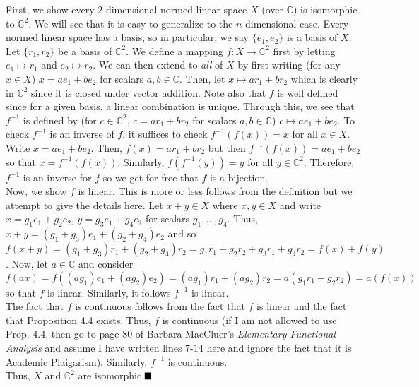 \documentclass{article}
\begin{document}
    First, we show every 2-dimensional normed linear space $X$ (over $\mathbb{C}$) is isomorphic to $\mathbb{C}^2$. 
    We will see that it is easy to generalize to the $n$-dimensional case.
    Every normed linear space has a basis, so in particular, we say $\{e_1,e_2\}$ is a basis of $X$. Let $\{r_1,r_2\}$ be a basis of $\mathbb{C}^2$.
    We define a mapping $f:X\to\mathbb{C}^2$ first by letting $e_1\mapsto r_1$ and $e_2\mapsto r_2$. We can then extend to \textit{all} of $X$ by first writing
    (for any $x\in X$) $x = ae_1 + be_2$ for scalars $a,b\in\mathbb{C}$. Then, let $x\mapsto ar_1 + br_2$ which is clearly in $\mathbb{C}^2$ since it is closed under
    vector addition. Note also that $f$ is well defined since for a given basis, a linear combination is unique.
    Through this, we see that $f^{-1}$ is defined by (for $c\in\mathbb{C}^2$, $c = ar_1+br_2$ for scalars $a,b\in\mathbb{C}$)
    $c\mapsto ae_1 + be_2$. To check $f^{-1}$ is an inverse of $f$, it suffices to check $f^{-1}(f(x)) = x$ for all $x\in X$. Write $x = ae_1 + be_2$. Then,
    $f(x) = ar_1 + br_2$ but then $f^{-1}(f(x)) = ae_1 + be_2$ so that $x = f^{-1}(f(x))$. Similarly, $f(f^{-1}(y)) = y$ for all $y\in\mathbb{C}^2$.
    Therefore, $f^{-1}$ is an inverse for $f$ so we get for free that $f$ is a bijection.\\

    Now, we show $f$ is linear. This is more or less follows from the definition but we attempt to give the details here. Let $x+y\in X$ where
    $x,y\in X$ and write $x = g_1e_1 + g_2e_2$, $y = g_3e_1 + g_4e_2$ for scalars $g_1,\hdots,g_4$. Thus,
    $x+y = (g_1+g_3)e_1 + (g_2+g_4)e_2$ and so $f(x+y) = (g_1+g_3)r_1 + (g_2+g_4)r_2 = g_1r_1 + g_2r_2 + g_3r_1 + g_4r_2 = f(x) + f(y)$. Now, let $a\in\mathbb{C}$
    and consider $f(ax) = f((ag_1)e_1 + (ag_2)e_2) = (ag_1)r_1 + (ag_2)r_2 = a(g_1r_1 + g_2r_2) = a(f(x))$ so that $f$ is linear. Similarly, it follows
    $f^{-1}$ is linear.\\
    
    The fact that $f$ is continuous follows from the fact that $f$ is linear and the fact that Proposition 4.4 exists. Thus, $f$ is
    continuous (if I am not allowed to use Prop. 4.4, then go to page 80 of Barbara MacCluer's \textit{Elementary Functional Analysis} and assume I have written lines 
    7-14 here and ignore the fact that it is Academic Plaigarism). Similarly, $f^{-1}$ is continuous.\\
    
    Thus, $X$ and $\mathbb{C}^2$ are isomorphic.$\hfill\blacksquare$\\
\end{document}
